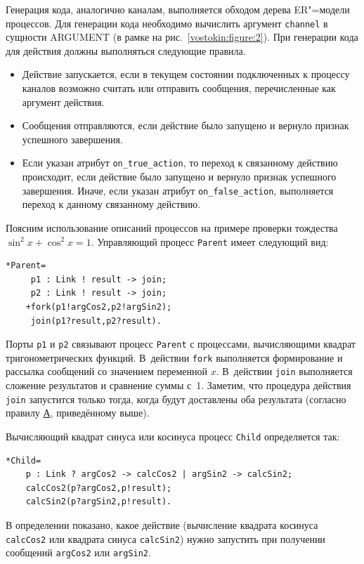 Генерация кода, аналогично каналам, выполняется обходом дерева ER"=модели процессов. 
Для генерации кода необходимо вычислить аргумент \verb"channel" в сущности ARGUMENT (в рамке на рис.~\ref{vostokin:figure:2}). При генерации кода для действия должны выполняться следующие правила. 
\begin{itemize}
\item[А.] Действие\hypertarget{vos:A}{} запускается, если в текущем состоянии подключенных к процессу каналов возможно считать или отправить сообщения, перечисленные как аргумент действия. 
\item[Б.] Сообщения отправляются, если действие было запущено и вернуло признак успешного завершения.
\item[В.] Если указан атрибут  \verb"on_true_action", то переход к связанному действию происходит, если  действие было запущено и вернуло признак успешного завершения. Иначе, если указан атрибут  \verb"on_false_action",  выполняется переход к данному связанному действию.
\end{itemize}

Поясним использование описаний процессов на примере проверки тождества $\sin^2 x +\cos ^2 x =1$. Управляющий процесс \verb"Parent" имеет следующий вид: 
\begin{verbatim}
*Parent=
     p1 : Link ! result -> join;
     p2 : Link ! result -> join;
    +fork(p1!argCos2,p2!argSin2);
     join(p1?result,p2?result).
\end{verbatim}

Порты \verb"p1" и \verb"p2" связывают процесс \verb"Parent" с процессами, вычисляющими квадрат тригонометрических функций. 
В~действии \verb"fork" выполняется формирование и рассылка сообщений со значением переменной $x$. 
В~действии \verb"join" выполняется сложение результатов и сравнение суммы с~1. 
Заметим, что процедура действия \verb"join" запустится только тогда, когда будут доставлены оба результата (согласно правилу \hyperlink{vos:A}{А}, приведённому выше).

Вычисляющий квадрат синуса или косинуса процесс \verb"Child" определяется так:
\begin{verbatim}
*Child=
    p : Link ? argCos2 -> calcCos2 | argSin2 -> calcSin2;
    calcCos2(p?argCos2,p!result);
    calcSin2(p?argSin2,p!result).
\end{verbatim}

В определении показано, какое действие (вычисление квадрата косинуса \verb"calcCos2" или квадрата синуса \verb"calcSin2") нужно запустить при получении сообщений  \verb"argCos2" или \verb"argSin2".

